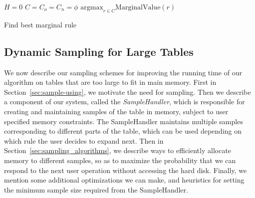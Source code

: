 \begin{algorithm}\label{algo:best-marginal-rule}
$H = 0$ 
$C = C_o = C_n = \phi$ 
\Return $\textrm{argmax}_{r \in C} \text{MarginalValue}(r)$
\caption{Find best marginal rule}
\end{algorithm}


\subsection{Dynamic Sampling for Large Tables}\label{sec:sampling}
We now describe our sampling schemes for improving the running time of our algorithm on tables that are too large to fit in main memory. First in Section~\ref{sec:sample-using}, we motivate the need for sampling. Then we describe a component of our system, called the {\em SampleHandler}, which is responsible for creating and maintaining samples of the table in memory, subject to user specified memory constraints. The SampleHandler maintains multiple samples corresponding to different parts of the table, which can be used depending on which rule the user decides to expand next. Then in Section~\ref{sec:sampling_algorithms}, we describe ways to efficiently allocate memory to different samples, so as to maximize the probability that we can respond to the next user operation without accessing the hard disk. Finally, we mention some additional optimizations we can make, and heuristics for setting the minimum sample size required from the SampleHandler.

